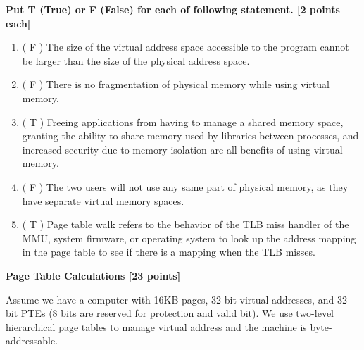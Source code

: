 \documentclass[addpoints, 12pt, answers]{exam}
\begin{document}
\begin{questions}

	\question[10] \textbf{Put T (True) or F (False) for each of following statement. [2 points each]}

	\begin{enumerate}[(1)]
		\item ( F ) The size of the virtual address space accessible to the program cannot be larger than the size of the physical address space.
		\item ( F ) There is no fragmentation of physical memory while using virtual memory.
		\item ( T ) Freeing applications from having to manage a shared memory space, granting the ability to share memory used by libraries between processes, and increased security due to memory isolation are all benefits of using virtual memory.
		\item ( F ) The two users will not use any same part of physical memory, as they have separate virtual memory spaces.
		\item ( T ) Page table walk refers to the behavior of the TLB miss handler of the MMU, system firmware, or operating system to look up the address mapping in the page table to see if there is a mapping when the TLB misses.
	\end{enumerate}

	\pagebreak

	\question[23] \textbf{Page Table Calculations [23 points]}

	Assume we have a computer with 16KB pages, 32-bit virtual addresses, and 32-bit PTEs (8 bits are reserved for protection and valid bit). We use two-level hierarchical page tables to manage virtual address and the machine is byte-addressable.
\end{questions}
\end{document}

